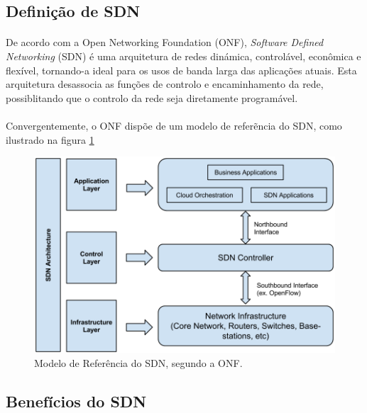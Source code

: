 \documentclass{llncs}
\begin{document}
\subsection{Definição de SDN}
\paragraph{}
De acordo com a Open Networking Foundation (ONF), \textit{Software Defined Networking} (SDN) é uma arquitetura de redes dinámica, controlável, econômica e flexível, tornando-a ideal para os usos de banda larga das aplicações atuais. 
Esta arquitetura desassocia as funções de controlo e encaminhamento da rede, possiblitando que o controlo da rede seja diretamente programável. \cite{fundation2012software}
\paragraph{}
Convergentemente, o ONF dispõe de um modelo de referẽncia do SDN, como ilustrado na figura \ref{fig:controller}
\begin{figure}
\begin{center}
\includegraphics[scale=0.40]{figura1.png} 
\end{center}
\caption{\label{fig:controller}Modelo de Referência do SDN, segundo a ONF.}
\end{figure} 
\paragraph{}

\subsection{Benefícios do SDN}
\end{document}
